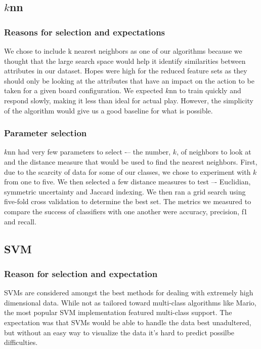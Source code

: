 \documentclass[]{article}   %
\begin{document}
\subsection{$k$nn}
\subsubsection{Reasons for selection and expectations}
We chose to include k nearest neighbors as one of our algorithms because we thought that the large search space 
would help it identify similarities between attributes in our dataset. Hopes were high for the reduced feature 
sets as they should only be looking at the attributes that have an impact on the action to be taken for a given 
board configuration.  We expected $k$nn to train quickly and respond slowly, making it less than ideal for actual play. 
However, the simplicity of the algorithm would give us a good baseline for what is possible.

\subsubsection{Parameter selection}
$k$nn had very few parameters to select -– the number, $k$, of neighbors to look at and the distance measure that would 
be used to find the nearest neighbors. First, due to the scarcity of data for some of our classes, we chose to 
experiment with $k$ from one to five. We then selected a few distance measures to test –- Euclidian, symmetric uncertainty 
and Jaccard indexing. We then ran a grid search using five-fold cross validation to determine the best set. The metrics 
we measured to compare the success of classifiers with one another were accuracy, precision, f1 and recall. 

\subsection{SVM}
\subsubsection{Reason for selection and expectation}
SVMs are considered amongst the best methods for dealing with extremely high dimensional data.  While not as tailored toward multi-class algorithms like Mario, the most popular SVM implementation featured multi-class support.  
\newline\newline
The expectation was that SVMs would be able to handle the data best unadultered, but without an easy way to visualize the data it's hard to predict possilbe difficulties.
\end{document}
